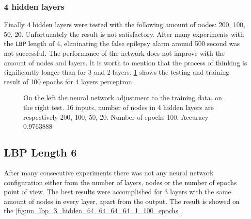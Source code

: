 \subsubsection{4 hidden layers}

Finally 4 hidden layers were tested with the following amount of nodes: 200, 100, 50, 20. Unfortunately the result is not satisfactory. After many experiments with the \verb|LBP| length of 4, eliminating the false epilepsy alarm around 500 second was not successful. The performance of the network does not improve with the amount of nodes and layers. It is worth to mention that the process of thinking is significantly longer than for 3 and 2 layers. \figurename{} \ref{fig:nn_lbp_4_hidden_200_100_50_20_1_500_epochs} shows the testing and training result of 100 epochs for 4 layers perceptron.

\begin{figure}[H]
	\begin{center}
	\end{center}
	\caption{On the left the neural network adjustment to the training data, on the right test. 16 inputs, number of nodes in 4 hidden layers are respectively 200, 100, 50, 20. Number of epochs 100. Accuracy \num{0.9763888}}

	\label{fig:nn_lbp_4_hidden_200_100_50_20_1_500_epochs}
\end{figure}

\subsection{LBP Length 6}
After many consecutive experiments there was not any neural network configuration either from the number of layers, nodes or the number of epochs point of view. The best results were accomplished for 3 layers with the same amount of nodes in every layer, apart from the output. The result is showed on the \figurename{} \ref{fig:nn_lbp_3_hidden_64_64_64_64_1_100_epochs} 

